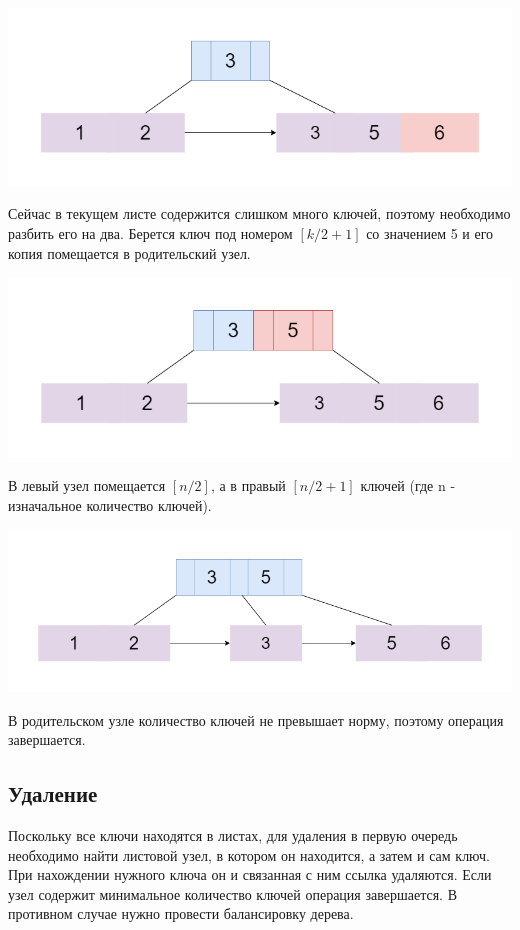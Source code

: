 \documentclass{article}
\begin{document}
\includegraphics[scale=0.4]{binsert21.png}

Сейчас в текущем листе содержится слишком много ключей, поэтому необходимо разбить его на два. Берется ключ под номером $[k/2+1]$ со значением 5 и его копия помещается в родительский узел.

\includegraphics[scale=0.4]{binsert22 (1).png}

В левый узел помещается $[n/2]$, а в правый $[n/2+1]$ ключей (где n - изначальное количество ключей).

\includegraphics[scale=0.4]{binsert23 (1).png}

В родительском узле количество ключей не превышает норму, поэтому операция завершается.

\subsection{Удаление}
  Поскольку все ключи находятся в листах, для удаления в первую очередь необходимо найти листовой узел, в котором он находится, а затем и сам ключ. При нахождении нужного ключа он и связанная с ним ссылка удаляются. Если узел содержит минимальное количество ключей операция завершается. В противном случае нужно провести балансировку дерева.
\end{document}
